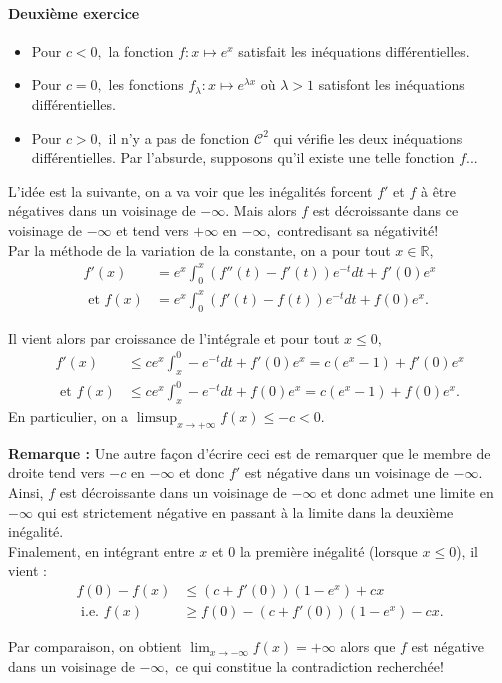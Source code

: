\paragraph{Deuxième exercice}

\begin{itemize}
\item Pour $c<0,$ la fonction $\displaystyle f: x\mapsto e^{x}$ satisfait les inéquations différentielles.
\item Pour $c=0,$ les fonctions $\displaystyle f_{\lambda} :x \mapsto e^{\lambda x}$ où $\lambda>1$ satisfont les inéquations différentielles.
\item Pour $c>0,$ il n'y a pas de fonction $\mathcal{C}^{2}$ qui vérifie les deux inéquations différentielles.
Par l'absurde, supposons qu'il existe une telle fonction $f$...
\end{itemize}

L'idée est la suivante, on a va voir que les inégalités forcent $f'$ et $f$ à être négatives dans un voisinage de $-\infty.$
Mais alors $f$ est décroissante dans ce voisinage de $-\infty$ et tend vers $+\infty$ en $-\infty,$ contredisant sa négativité!
\\

Par la méthode de la variation de la constante, on a pour tout $x\in\mathbb{R},$
\begin{align*}
f'(x) & =e^{x}\int_{0}^{x}\left(f''(t)-f'(t)\right)e^{-t}dt+f'(0)e^{x}\\
\mbox{ et } f(x) & =e^{x}\int_{0}^{x}\left(f'(t)-f(t)\right)e^{-t}dt+f(0)e^{x}.
\end{align*}

Il vient alors par croissance de l'intégrale et pour tout $x\leq 0,$ \begin{align*}
f'(x) & \leq ce^{x}\int_{x}^{0}-e^{-t}dt+f'(0)e^{x} = c(e^{x}-1)+f'(0)e^{x}\\
\mbox{ et } f(x)& \leq ce^{x}\int_{x}^{0}-e^{-t}dt+f(0)e^{x} = c(e^{x}-1)+f(0)e^{x}.
\end{align*}
En particulier, on a $\displaystyle \limsup_{x\rightarrow +\infty} f(x) \leq -c<0.$ 

\textbf{Remarque : } Une autre façon d'écrire ceci est de remarquer que le membre de droite tend vers $-c$ en $-\infty$ et donc $f'$ est négative dans un voisinage de $-\infty.$ Ainsi, $f$ est décroissante dans un voisinage de $-\infty$ et donc admet une limite en $-\infty$ qui est strictement négative en passant à la limite dans la deuxième inégalité.
\\

Finalement, en intégrant entre $x$ et $0$ la première inégalité (lorsque $x\leq 0$), il vient : 
\begin{align*}
f(0)-f(x) & \leq (c+f'(0))(1-e^{x})+cx\\
\mbox{ i.e. } f(x) & \geq f(0)-(c+f'(0))(1-e^{x})-cx.
\end{align*}

Par comparaison, on obtient $\displaystyle \lim_{x\rightarrow -\infty} f(x)=+\infty$ alors que $f$ est négative dans un voisinage de $-\infty,$ ce qui constitue la contradiction recherchée!

